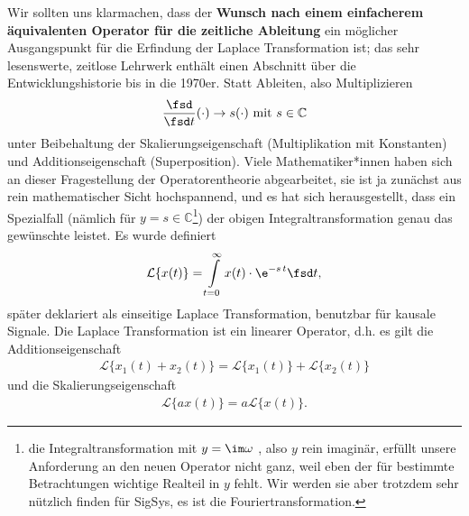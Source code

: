 Wir sollten uns klarmachen, dass der \textbf{Wunsch nach einem einfacherem äquivalenten
Operator für die zeitliche Ableitung} ein möglicher Ausgangspunkt für die
Erfindung der Laplace Transformation ist; das sehr lesenswerte,
zeitlose Lehrwerk \cite{LangeSigSys1} enthält
einen Abschnitt über die Entwicklungshistorie bis in die 1970er.
Statt Ableiten, also Multiplizieren
\begin{equation}
  \frac{\fsd }{\fsd t} (\cdot) \rightarrow s(\cdot ) \text{ mit } s \in \mathbb{C}
\end{equation}
unter Beibehaltung der Skalierungseigenschaft (Multiplikation mit Konstanten)
und Additionseigenschaft (Superposition).
%
Viele Mathematiker*innen haben sich an dieser Fragestellung der Operatorentheorie
abgearbeitet, sie ist ja zunächst aus rein mathematischer Sicht hochspannend, und
es hat sich herausgestellt, dass ein Spezialfall
(nämlich für $y=s\in\mathbb{C}$\footnote{die Integraltransformation mit $y=\im\omega$
, also $y$ rein imaginär, erfüllt unsere Anforderung an den neuen Operator nicht ganz,
weil eben der für bestimmte Betrachtungen wichtige Realteil in $y$ fehlt.
Wir werden sie aber trotzdem sehr nützlich finden
für SigSys, es ist die Fouriertransformation.})
der obigen
Integraltransformation genau das gewünschte leistet. Es wurde definiert
\begin{align}
\mathcal{L}\{x(t)\} = \int\limits_{t=0}^{\infty} x(t) \cdot \e^{-s\,t} \fsd t,
\end{align}
später deklariert als einseitige Laplace Transformation, benutzbar
für kausale Signale.
%
Die Laplace Transformation ist ein linearer Operator, d.h.
es gilt die Additionseigenschaft
\begin{align}
\mathcal{L}\{x_1(t)+x_2(t)\} = \mathcal{L}\{x_1(t)\} + \mathcal{L}\{x_2(t)\}
\end{align}
und die Skalierungseigenschaft
\begin{align}
\mathcal{L}\{a x(t)\} = a \mathcal{L}\{x(t)\}.
\end{align}

